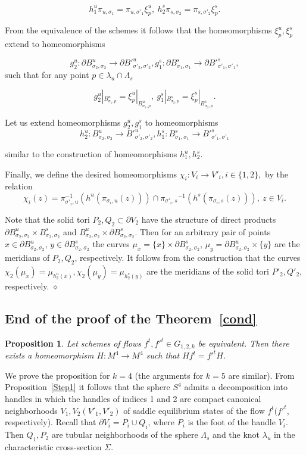 \documentclass[%
 aip,
 amsmath,amssymb,
preprint,%
]{revtex4-1}
\newtheorem{propos}{Proposition}
\newenvironment{proof}{{\bf Proof:}}
{\hfill $\diamond$\medskip}
\begin{document}
\begin{proof}
$$h^u_1\pi_{u,\sigma_1}=\pi_{u,\sigma'_1}\xi^u_p,\ h^s_2\pi_{s,\sigma_2}=\pi_{s,\sigma'_2}\xi^s_p.$$


From the equivalence of the schemes it follows that the homeomorphisms $\xi^u_p, \xi^s_p$ extend to homeomorphisms


$$g^u_2:\partial B^u_{\sigma_2,\sigma_2}\to \partial {B'}^u_{\sigma'_2, \sigma'_2}, g^s_1:\partial B^s_{\sigma_1,\sigma_1}\to \partial {B'}^s_{\sigma'_1, \sigma'_1},$$ such that for any point $p\in \lambda_u\cap \Lambda_s$

$$g^u_2|_{B^u_{\sigma_1, p}}=\xi^u_p|_{B^u_{\sigma_1, p}},\
g^s_1|_{B^s_{\sigma_2, p}}=\xi^s_p|_{B^s_{\sigma_2, p}}.$$

Let us extend homeomorphisms $g^u_2, g^s_1$ to homeomorphisms
$$h^u_2: B^u_{\sigma_2,\sigma_2}\to {B'}^u_{\sigma'_2, \sigma'_2}, h^s_1: B^s_{\sigma_1,\sigma_1}\to {B'}^s_{\sigma'_1, \sigma'_1}$$

similar to the construction of homeomorphisms $h^u_1, h^s_2$.

Finally, we define the desired homeomorphisms $\chi_{i}: V_i\to V'_i, i\in \{1,2\},$ by the relation
$$\chi_{i}(z)=\pi_{\sigma'_i,u}^{-1}(h^u(\pi_{\sigma_i,u}(z)))\cap {\pi_{\sigma'_i,s}}^{-1}(h^s(\pi_{\sigma_i,s}(z))),\ z\in V_{i}.$$

Note that the solid tori $P_2, Q_2\subset \partial V_2$ have the structure of direct products $\partial B^u_{\sigma_2, \sigma_2}\times B^s_{\sigma_2, \sigma_2}$ and $B^u_{\sigma_2, \sigma_2}\times \partial B^s_{\sigma_2, \sigma_2}$. Then for an arbitrary pair of points $x\in \partial B^u_{\sigma_2,\sigma_2}$, $y\in \partial B^s_{\sigma_2, \sigma_2}$ the curves $\mu_x=\{x\}\times \partial B^s_{\sigma_2, \sigma_2}$, $\mu_y=\partial B^u_{\sigma_2, \sigma_2}\times \{y\}$ are the meridians of $P_2, Q_2$, respectively. It follows from the construction that the curves $\chi_2(\mu_x)=\mu_{h^u_2(x)}, \chi_2(\mu_y)=\mu_{h^s_2(y)}$ are the meridians of the solid tori $P'_2, Q'_2$, respectively.
\end{proof}

\subsection{End of the proof of the Theorem~\ref{cond}}

\begin{propos}\label{Step4} Let  schemes of flows $f^t, {f'}^t\in G_{1,2,k}$ be equivalent. Then there exists a homeomorphism $H: M^4\to M^4$ such that $Hf^t={f'}^tH$.
\end{propos} We prove the proposition for $k=4$ (the arguments for $k=5$ are similar). From Proposition~\ref{Step1} it follows that the sphere $S^4$ admits a decomposition into handles in which the handles of indices 1 and 2 are compact canonical neighborhoods $V_1, V_2 (V'_1, V'_2)$ of saddle equilibrium states of the flow $f^t ({f'}^t$, respectively). Recall that $\partial V_i=P_i\cup Q_i$, where $P_i$ is the foot of the handle $V_i$. Then $Q_1, P_2$ are tubular neighborhoods of the sphere $\Lambda_s$ and the knot $\lambda_u$ in the characteristic cross-section $\Sigma$.
\end{document}
